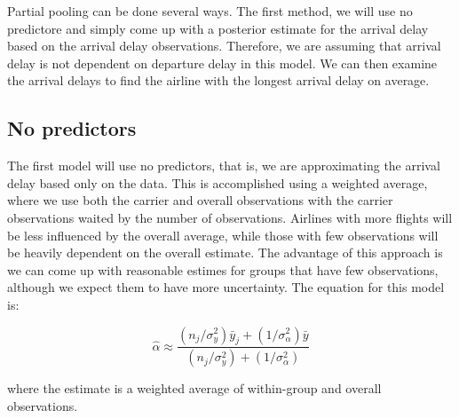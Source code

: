 \documentclass[11pt]{article}
\begin{document}
Partial pooling can be done several ways. The first method, we will use
no predictore and simply come up with a posterior estimate for the
arrival delay based on the arrival delay observations. Therefore, we are
assuming that arrival delay is not dependent on departure delay in this
model. We can then examine the arrival delays to find the airline with
the longest arrival delay on average.

    \hypertarget{no-predictors}{%
\subsection{No predictors}\label{no-predictors}}

The first model will use no predictors, that is, we are approximating
the arrival delay based only on the data. This is accomplished using a
weighted average, where we use both the carrier and overall observations
with the carrier observations waited by the number of observations.
Airlines with more flights will be less influenced by the overall
average, while those with few observations will be heavily dependent on
the overall estimate. The advantage of this approach is we can come up
with reasonable estimes for groups that have few observations, although
we expect them to have more uncertainty. The equation for this model is:

\[\hat{\alpha} \approx \frac{(n_j/\sigma_y^2)\bar{y}_j + (1/\sigma_{\alpha}^2)\bar{y}}{(n_j/\sigma_y^2) + (1/\sigma_{\alpha}^2)}\]

where the estimate is a weighted average of within-group and overall
observations.
\end{document}
